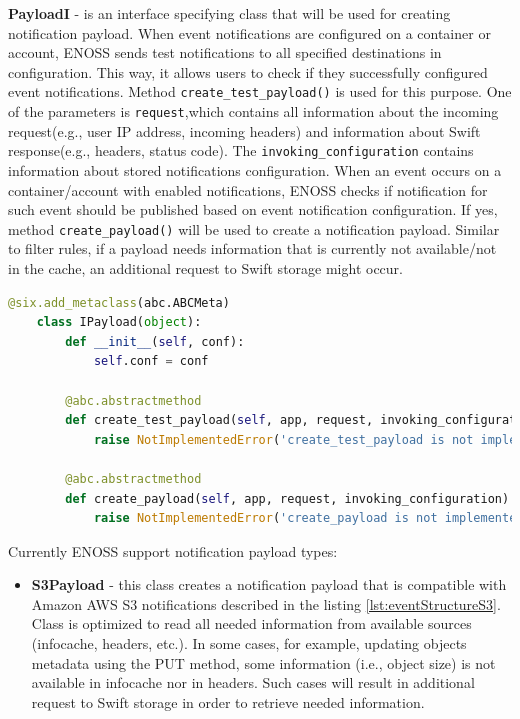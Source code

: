     \textbf{PayloadI} - is an interface specifying class that will be used for creating notification payload. When event notifications are configured on a container or account, ENOSS sends test notifications to all specified destinations in configuration. This way, it allows users to check if they successfully configured event notifications. Method \texttt{create\_test\_payload()} is used for this purpose. One of the parameters is \texttt{request},which contains all information about the incoming request(e.g., user IP address, incoming headers) and information about Swift response(e.g., headers, status code). The \texttt{invoking\_configuration} contains information about stored notifications configuration. When an event occurs on a container/account with enabled notifications, ENOSS checks if notification for such event should be published based on event notification configuration. If yes, method \texttt{create\_payload()} will be used to create a notification payload. Similar to filter rules, if a payload needs information that is currently not available/not in the cache, an additional request to Swift storage might occur.

    \begin{lstlisting}[language=Python, style=pythonStyle, caption=Interface of class used to create notification payload, label=lst:enoss-payloadi]
    @six.add_metaclass(abc.ABCMeta)
    class IPayload(object):
        def __init__(self, conf):
            self.conf = conf

        @abc.abstractmethod
        def create_test_payload(self, app, request, invoking_configuration):
            raise NotImplementedError('create_test_payload is not implemented')

        @abc.abstractmethod
        def create_payload(self, app, request, invoking_configuration):
            raise NotImplementedError('create_payload is not implemented')
    \end{lstlisting}

    Currently ENOSS support notification payload types:
    \begin{itemize}
        \item \textbf{S3Payload} - this class creates a notification payload that is compatible with Amazon AWS S3 notifications described in the listing \ref{lst:eventStructureS3}. Class is optimized to read all needed information from available sources (infocache, headers, etc.). In some cases, for example, updating objects metadata using the PUT method, some information (i.e., object size) is not available in infocache nor in headers. Such cases will result in additional request to Swift storage in order to retrieve needed information.
    \end{itemize}

